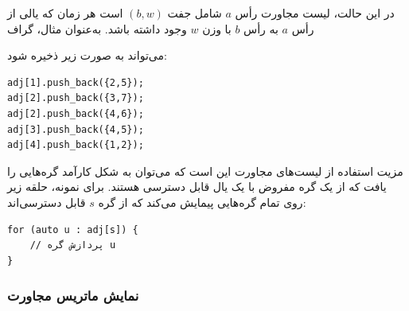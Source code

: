 در این حالت، لیست مجاورت رأس $a$
شامل جفت $(b,w)$ است
هر زمان که یالی از رأس $a$ به رأس $b$
با وزن $w$ وجود داشته باشد. به‌عنوان مثال، گراف

\begin{center}
\end{center}
می‌تواند به صورت زیر ذخیره شود:
\begin{lstlisting}
adj[1].push_back({2,5});
adj[2].push_back({3,7});
adj[2].push_back({4,6});
adj[3].push_back({4,5});
adj[4].push_back({1,2});
\end{lstlisting}

مزیت استفاده از لیست‌های مجاورت این است که
می‌توان به شکل کارآمد گره‌هایی را یافت که
از یک گره مفروض با یک یال قابل دسترسی هستند.
برای نمونه، حلقه زیر روی تمام گره‌هایی پیمایش می‌کند
که از گره $s$ قابل دسترسی‌اند:

\begin{lstlisting}
for (auto u : adj[s]) {
    // پردازش گره u
}
\end{lstlisting}

\subsubsection{نمایش ماتریس مجاورت}


